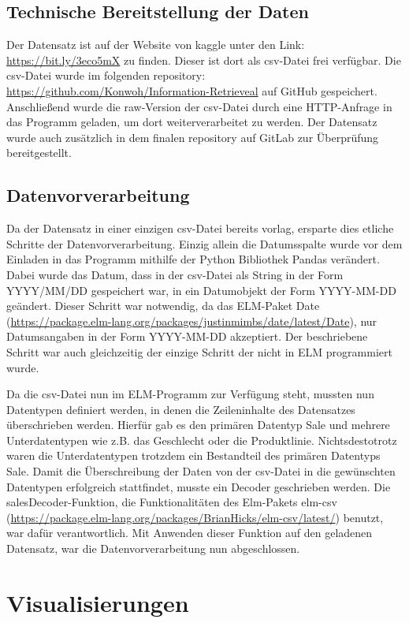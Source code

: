 \documentclass[usegeometry=true]{scrartcl}
\begin{document}
\subsection{Technische Bereitstellung der Daten}
Der Datensatz ist auf der Website von kaggle unter den Link: \url{https://bit.ly/3eco5mX} zu finden. Dieser ist dort als csv-Datei frei verfügbar. Die csv-Datei wurde im
folgenden repository: \url{https://github.com/Konwoh/Information-Retrieveal} auf GitHub gespeichert. Anschließend wurde die raw-Version der csv-Datei durch eine HTTP-Anfrage
in das Programm geladen, um dort weiterverarbeitet zu werden. Der Datensatz wurde auch zusätzlich in dem finalen repository auf GitLab zur Überprüfung bereitgestellt.

\subsection{Datenvorverarbeitung}
Da der Datensatz in einer einzigen csv-Datei bereits vorlag, ersparte dies etliche Schritte der Datenvorverarbeitung. Einzig allein die Datumsspalte wurde vor dem Einladen
in das Programm mithilfe der Python Bibliothek Pandas verändert. Dabei wurde das Datum, dass in der csv-Datei als String in der Form YYYY/MM/DD gespeichert war, in ein
Datumobjekt der Form YYYY-MM-DD geändert. Dieser Schritt war notwendig, da das ELM-Paket Date (\url{https://package.elm-lang.org/packages/justinmimbs/date/latest/Date}),
nur Datumsangaben in der Form YYYY-MM-DD akzeptiert. Der beschriebene Schritt war auch gleichzeitig der einzige Schritt der nicht in ELM programmiert wurde.

\noindent Da die csv-Datei nun im ELM-Programm zur Verfügung steht, mussten nun Datentypen definiert werden, in denen die Zeileninhalte des Datensatzes überschrieben werden.
Hierfür gab es den primären Datentyp Sale und mehrere Unterdatentypen wie z.B. das Geschlecht oder die Produktlinie. Nichtsdestotrotz waren die Unterdatentypen trotzdem ein
Bestandteil des primären Datentyps Sale. Damit die Überschreibung der Daten von der csv-Datei in die gewünschten Datentypen erfolgreich stattfindet, musste ein Decoder
geschrieben werden. Die salesDecoder-Funktion, die Funktionalitäten des Elm-Pakets elm-csv (\url{https://package.elm-lang.org/packages/BrianHicks/elm-csv/latest/}) benutzt, war
dafür verantwortlich. Mit Anwenden dieser Funktion auf den geladenen Datensatz, war die Datenvorverarbeitung nun abgeschlossen.

\section{Visualisierungen}
\end{document}
